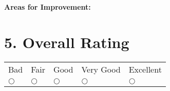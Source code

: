 \documentclass[11pt]{article}
\begin{document}
  \noindent \textbf{Areas for Improvement:}
  \vspace{2cm}

  \section*{5. Overall Rating}
  \vspace{0.5cm}
  \begin{center}
    \begin{tabular}{p{1.8cm}p{1.8cm}p{1.8cm}p{1.8cm}p{1.8cm}}
      Bad & Fair & Good & Very Good & Excellent\\
      $\bigcirc$ & $\bigcirc$ & $\bigcirc$ & $\bigcirc$ & $\bigcirc$\\
    \end{tabular}
  \end{center}
\end{document}
